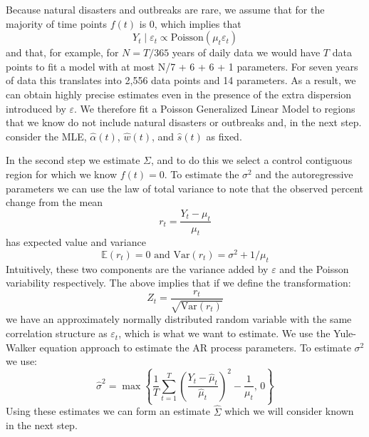 \documentclass[11pt]{article}
\begin{document}
Because natural disasters and outbreaks are rare, we assume that for the majority of time points $f(t)$ is 0, which implies that 
\begin{equation*}
    Y_t \mid \varepsilon_t \propto \mbox{Poisson}(\mu_t  \varepsilon_t )
\end{equation*}
and that, for example, for $N = T / 365$ years of daily data we would have $T$ data points to fit a model with at most N/7 + 6 + 6 + 1 parameters. For seven years of data this translates into 2,556 data points and 14 parameters. As a result, we can obtain highly precise estimates even in the presence of the extra dispersion introduced by $\varepsilon$. We therefore fit a Poisson Generalized Linear Model to regions that we know do not include natural disasters or outbreaks and, in the next step. consider the MLE, $\hat{\alpha}(t)$, $\hat{w}(t)$, and $\hat{s}(t)$ as fixed.

In the second step we estimate $\Sigma$, and to do this we select a control contiguous region for which we know $f(t)=0$. To estimate the $\sigma^2$ and the autoregressive parameters we can use the law of total variance to note that the observed percent change from the mean
\begin{equation*}
    r_t = \frac{Y_t - \mu_t}{\mu_t}
\end{equation*}
has expected value and variance
\begin{equation*}
    \mathbb{E}\left(r_t \right) = 0 \mbox{ and } \mbox{Var}\left(r_t\right)= \sigma^2 + 1/\mu_t
\end{equation*}
Intuitively, these two components are the variance added by $\varepsilon$ and the Poisson variability respectively. The above implies that if we define the transformation:
\begin{equation*}
    Z_t = \frac{r_t}{\sqrt{\mbox{Var}\left(r_t\right)}}
\end{equation*}
we have an approximately normally distributed random variable with the same correlation structure as $\varepsilon_t$, which is what we want to estimate. We use the Yule-Walker equation approach to estimate the AR process parameters. To estimate $\sigma^2$ we use:
\begin{equation*}
    \hat{\sigma}^2 = \max\left\{ \frac{1}{T}\sum_{t=1}^T  \left(\frac{Y_t - \hat{\mu}_t}{\hat{\mu}_t}\right)^2  - \frac{1}{\mu_t}, \, 0\right\}
\end{equation*}
Using these estimates we can form an estimate $\hat{\Sigma}$ which we will consider known in the next step.
\end{document}
